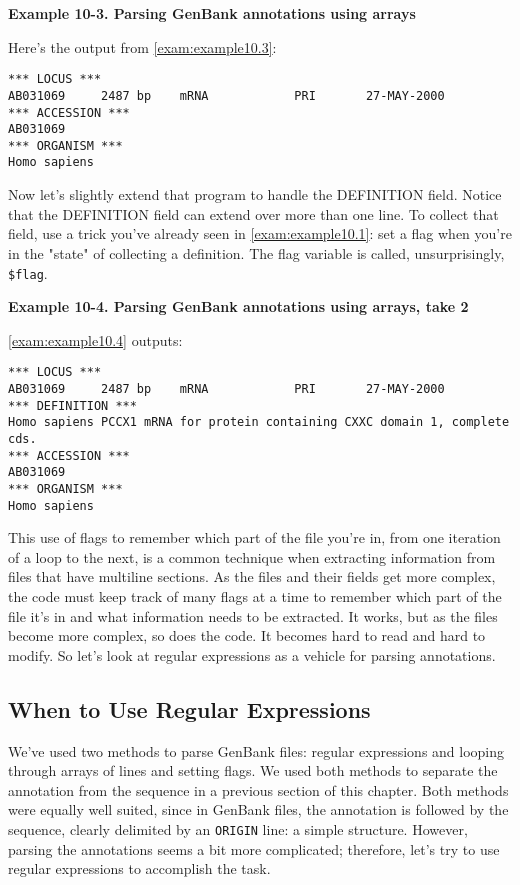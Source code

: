 \textbf{Example 10-3. Parsing GenBank annotations using arrays}


Here's the output from \autoref{exam:example10.3}:

\begin{lstlisting}
*** LOCUS ***
AB031069     2487 bp    mRNA            PRI       27-MAY-2000
*** ACCESSION ***
AB031069
*** ORGANISM ***
Homo sapiens
\end{lstlisting}

Now let's slightly extend that program to handle the DEFINITION field.  Notice that the DEFINITION field can extend over more than one line. To collect that field, use a trick you've already seen in \autoref{exam:example10.1}: set a flag when you're in the "state" of collecting a definition. The flag variable is called, unsurprisingly, \verb|$flag|. 

\textbf{Example 10-4. Parsing GenBank annotations using arrays, take 2}


\autoref{exam:example10.4} outputs:

\begin{lstlisting}
*** LOCUS ***
AB031069     2487 bp    mRNA            PRI       27-MAY-2000
*** DEFINITION ***
Homo sapiens PCCX1 mRNA for protein containing CXXC domain 1, complete
cds.
*** ACCESSION ***
AB031069
*** ORGANISM ***
Homo sapiens
\end{lstlisting}

This use of flags to remember which part of the file you're in, from one iteration of a loop to the next, is a common technique when extracting information from files that have multiline sections. As the files and their fields get more complex, the code must keep track of many flags at a time to remember which part of the file it's in and what information needs to be extracted. It works, but as the files become more complex, so does the code. It becomes hard to read and hard to modify. So let's look at regular expressions as a vehicle for parsing annotations. 

\subsection{When to Use Regular Expressions}
We've used two methods to parse GenBank files: regular expressions and looping through arrays of lines and setting flags. We used both methods to separate the annotation from the sequence in a previous section of this chapter. Both methods were equally well suited, since in GenBank files, the annotation is followed by the sequence, clearly delimited by an \verb|ORIGIN| line: a simple structure. However, parsing the annotations seems a bit more complicated; therefore, let's try to use regular expressions to accomplish the task.

